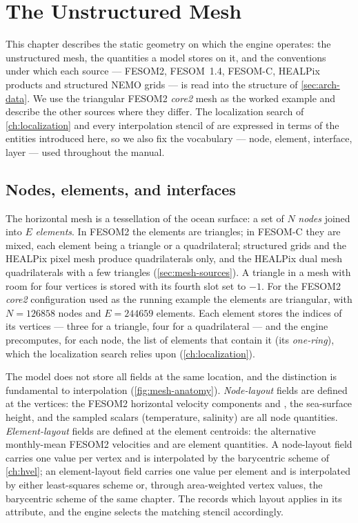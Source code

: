 \chapter{The Unstructured Mesh}\label{ch:mesh}

This chapter describes the static geometry on which the engine operates: the
unstructured mesh, the quantities a model stores on it, and the conventions under which each source ---
FESOM2, FESOM~1.4, FESOM-C, HEALPix products and structured NEMO grids --- is read into the  structure of
\cref{sec:arch-data}. We use the triangular FESOM2 \emph{core2} mesh as the worked example and describe
the other sources where they differ. The localization search of \cref{ch:localization} and every
interpolation stencil of  are expressed in terms of
the entities introduced here, so we also fix the vocabulary --- node, element,
interface, layer --- used throughout the manual.

\section{Nodes, elements, and interfaces}\label{sec:mesh-anatomy}

The horizontal mesh is a tessellation of the ocean surface: a set of $N$
\emph{nodes} joined into $E$ \emph{elements}.  In FESOM2
the elements are triangles; in FESOM-C they are mixed, each element being a triangle
or a quadrilateral; structured grids and the HEALPix pixel mesh produce quadrilaterals only, and the
HEALPix dual mesh quadrilaterals with a few triangles (\cref{sec:mesh-sources}). A triangle in a mesh with room for four vertices is stored with its fourth slot
set to $-1$.
For the FESOM2 \emph{core2} configuration used as the running example the elements are
triangular, with $N=\num{126858}$ nodes and $E=\num{244659}$ elements. Each element
stores the indices of its vertices --- three for a triangle, four for a quadrilateral
--- and the engine precomputes, for each node, the list of elements that contain it
(its \emph{one-ring}), which the localization search relies upon
(\cref{ch:localization}).

The model does not store all fields at the same location, and the distinction is
fundamental to interpolation (\cref{fig:mesh-anatomy}). \emph{Node-layout} fields
are defined at the vertices: the FESOM2 horizontal velocity components 
and , the sea-surface height, and the sampled scalars (temperature,
salinity) are all node quantities. \emph{Element-layout} fields are defined at the
element centroids: the alternative monthly-mean FESOM2 velocities  and
 are element quantities. A node-layout field carries one value per vertex
and is interpolated by the barycentric scheme of \cref{ch:hvel}; an element-layout
field carries one value per element and is interpolated by either least-squares scheme or,
through area-weighted vertex values, the barycentric scheme of the same chapter. The  records which layout applies in
its  attribute, and the engine selects the matching stencil
accordingly.

